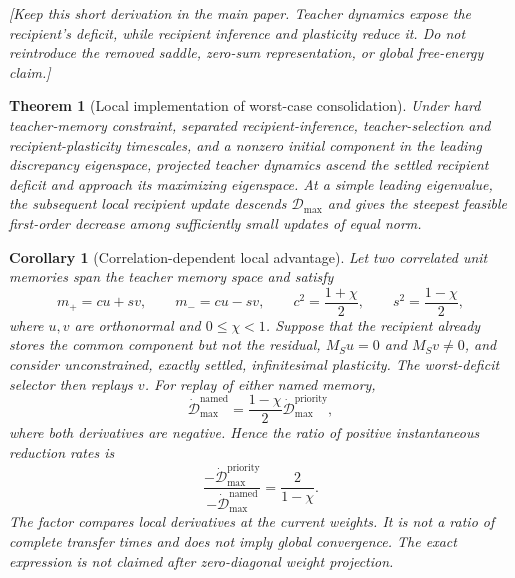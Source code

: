 \documentclass[10pt,letterpaper]{article}
\theoremstyle{plain}
\newtheorem{theorem}{Theorem}
\newtheorem{corollary}{Corollary}
\theoremstyle{remark}
\begin{document}
\textit{[Keep this short derivation in the main paper. Teacher dynamics expose the recipient's deficit, while recipient inference and plasticity reduce it. Do not reintroduce the removed saddle, zero-sum representation, or global free-energy claim.]}

\begin{theorem}[Local implementation of worst-case consolidation]
\label{thm:minimax-transfer}
Under hard teacher-memory constraint, separated recipient-inference, teacher-selection and recipient-plasticity timescales, and a nonzero initial component in the leading discrepancy eigenspace, projected teacher dynamics ascend the settled recipient deficit and approach its maximizing eigenspace. At a simple leading eigenvalue, the subsequent local recipient update descends $\mathcal D_{\max}$ and gives the steepest feasible first-order decrease among sufficiently small updates of equal norm.
\end{theorem}

\begin{corollary}[Correlation-dependent local advantage]
\label{cor:correlated-local}
Let two correlated unit memories span the teacher memory space and satisfy
\begin{equation}
m_+=cu+sv,
\qquad
m_-=cu-sv,
\qquad
c^2=\frac{1+\chi}{2},
\qquad
s^2=\frac{1-\chi}{2},
\end{equation}
where $u,v$ are orthonormal and $0\leq\chi<1$. Suppose that the recipient already stores the common component but not the residual, $M_Su=0$ and $M_Sv\neq0$, and consider unconstrained, exactly settled, infinitesimal plasticity. The worst-deficit selector then replays $v$. For replay of either named memory,
\begin{equation}
\dot{\mathcal D}_{\max}^{\mathrm{named}}
=
\frac{1-\chi}{2}
\dot{\mathcal D}_{\max}^{\mathrm{priority}},
\end{equation}
where both derivatives are negative. Hence the ratio of positive instantaneous reduction rates is
\begin{equation}
\boxed{
\frac{-\dot{\mathcal D}_{\max}^{\mathrm{priority}}}
{-\dot{\mathcal D}_{\max}^{\mathrm{named}}}
=
\frac{2}{1-\chi}.
}
\label{eq:local-correlation-speedup}
\end{equation}
The factor compares local derivatives at the current weights. It is not a ratio of complete transfer times and does not imply global convergence. The exact expression is not claimed after zero-diagonal weight projection.
\end{corollary}
\end{document}
